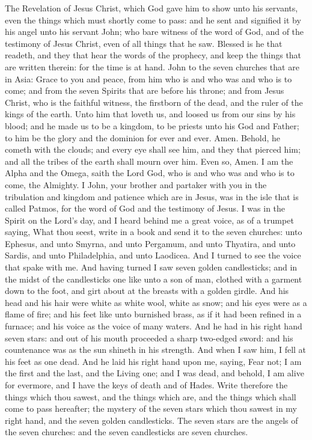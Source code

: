 


The Revelation of Jesus Christ, which God gave him to show unto his servants, even the things which must shortly come to pass: and he sent and signified it by his angel unto his servant John; who bare witness of the word of God, and of the testimony of Jesus Christ, even of all things that he saw. Blessed is he that readeth, and they that hear the words of the prophecy, and keep the things that are written therein: for the time is at hand.  John to the seven churches that are in Asia: Grace to you and peace, from him who is and who was and who is to come; and from the seven Spirits that are before his throne; and from Jesus Christ, who is the faithful witness, the firstborn of the dead, and the ruler of the kings of the earth. Unto him that loveth us, and loosed us from our sins by his blood; and he made us to be a kingdom, to be priests unto his God and Father; to him be the glory and the dominion for ever and ever. Amen. Behold, he cometh with the clouds; and every eye shall see him, and they that pierced him; and all the tribes of the earth shall mourn over him. Even so, Amen.  I am the Alpha and the Omega, saith the Lord God, who is and who was and who is to come, the Almighty.  I John, your brother and partaker with you in the tribulation and kingdom and patience which are in Jesus, was in the isle that is called Patmos, for the word of God and the testimony of Jesus. I was in the Spirit on the Lord’s day, and I heard behind me a great voice, as of a trumpet saying, What thou seest, write in a book and send it to the seven churches: unto Ephesus, and unto Smyrna, and unto Pergamum, and unto Thyatira, and unto Sardis, and unto Philadelphia, and unto Laodicea. And I turned to see the voice that spake with me. And having turned I saw seven golden candlesticks; and in the midst of the candlesticks one like unto a son of man, clothed with a garment down to the foot, and girt about at the breasts with a golden girdle. And his head and his hair were white as white wool, white as snow; and his eyes were as a flame of fire; and his feet like unto burnished brass, as if it had been refined in a furnace; and his voice as the voice of many waters. And he had in his right hand seven stars: and out of his mouth proceeded a sharp two-edged sword: and his countenance was as the sun shineth in his strength. And when I saw him, I fell at his feet as one dead. And he laid his right hand upon me, saying, Fear not; I am the first and the last, and the Living one; and I was dead, and behold, I am alive for evermore, and I have the keys of death and of Hades. Write therefore the things which thou sawest, and the things which are, and the things which shall come to pass hereafter; the mystery of the seven stars which thou sawest in my right hand, and the seven golden candlesticks. The seven stars are the angels of the seven churches: and the seven candlesticks are seven churches. 

